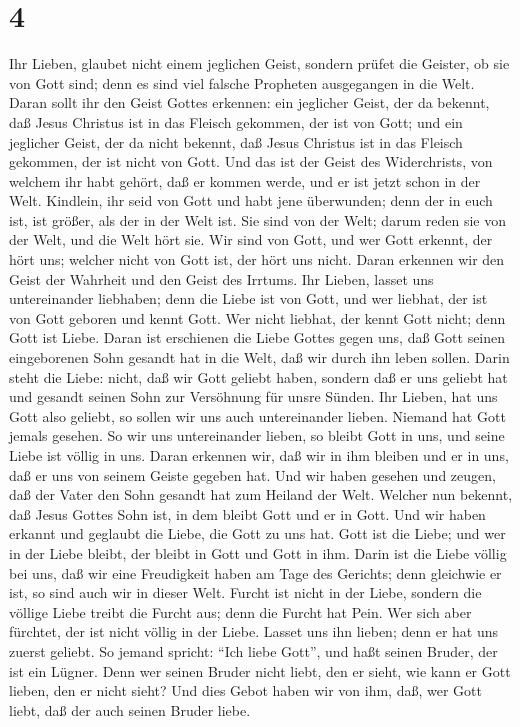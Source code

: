 \hypertarget{section-3}{%
\section{4}\label{section-3}}

 Ihr Lieben, glaubet nicht einem jeglichen Geist, sondern
prüfet die Geister, ob sie von Gott sind; denn es sind viel falsche
Propheten ausgegangen in die Welt.  Daran sollt ihr den
Geist Gottes erkennen: ein jeglicher Geist, der da bekennt, daß Jesus
Christus ist in das Fleisch gekommen, der ist von Gott;  und
ein jeglicher Geist, der da nicht bekennt, daß Jesus Christus ist in das
Fleisch gekommen, der ist nicht von Gott. Und das ist der Geist des
Widerchrists, von welchem ihr habt gehört, daß er kommen werde, und er
ist jetzt schon in der Welt.  Kindlein, ihr seid von Gott
und habt jene überwunden; denn der in euch ist, ist größer, als der in
der Welt ist.  Sie sind von der Welt; darum reden sie von
der Welt, und die Welt hört sie.  Wir sind von Gott, und wer
Gott erkennt, der hört uns; welcher nicht von Gott ist, der hört uns
nicht. Daran erkennen wir den Geist der Wahrheit und den Geist des
Irrtums.  Ihr Lieben, lasset uns untereinander liebhaben;
denn die Liebe ist von Gott, und wer liebhat, der ist von Gott geboren
und kennt Gott.  Wer nicht liebhat, der kennt Gott nicht;
denn Gott ist Liebe.  Daran ist erschienen die Liebe Gottes
gegen uns, daß Gott seinen eingeborenen Sohn gesandt hat in die Welt,
daß wir durch ihn leben sollen.  Darin steht die Liebe:
nicht, daß wir Gott geliebt haben, sondern daß er uns geliebt hat und
gesandt seinen Sohn zur Versöhnung für unsre Sünden.  Ihr
Lieben, hat uns Gott also geliebt, so sollen wir uns auch untereinander
lieben.  Niemand hat Gott jemals gesehen. So wir uns
untereinander lieben, so bleibt Gott in uns, und seine Liebe ist völlig
in uns.  Daran erkennen wir, daß wir in ihm bleiben und er
in uns, daß er uns von seinem Geiste gegeben hat.  Und wir
haben gesehen und zeugen, daß der Vater den Sohn gesandt hat zum Heiland
der Welt.  Welcher nun bekennt, daß Jesus Gottes Sohn ist,
in dem bleibt Gott und er in Gott.  Und wir haben erkannt
und geglaubt die Liebe, die Gott zu uns hat. Gott ist die Liebe; und wer
in der Liebe bleibt, der bleibt in Gott und Gott in ihm. 
Darin ist die Liebe völlig bei uns, daß wir eine Freudigkeit haben am
Tage des Gerichts; denn gleichwie er ist, so sind auch wir in dieser
Welt.  Furcht ist nicht in der Liebe, sondern die völlige
Liebe treibt die Furcht aus; denn die Furcht hat Pein. Wer sich aber
fürchtet, der ist nicht völlig in der Liebe.  Lasset uns
ihn lieben; denn er hat uns zuerst geliebt.  So jemand
spricht: ``Ich liebe Gott'', und haßt seinen Bruder, der ist ein Lügner.
Denn wer seinen Bruder nicht liebt, den er sieht, wie kann er Gott
lieben, den er nicht sieht?  Und dies Gebot haben wir von
ihm, daß, wer Gott liebt, daß der auch seinen Bruder liebe.

